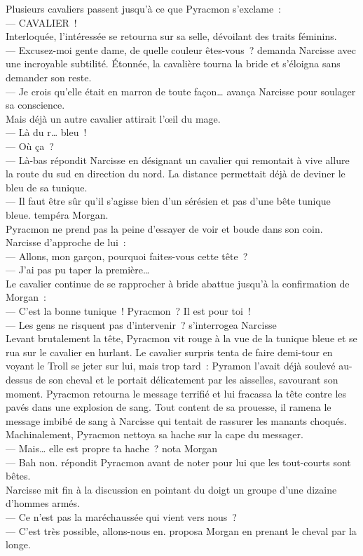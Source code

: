 \documentclass[french, a4paper, 12pt]{article}
\begin{document}
Plusieurs cavaliers passent jusqu'à ce que Pyracmon s'exclame~:\\
--- CAVALIER~!\\
Interloquée, l'intéressée se retourna sur sa selle, dévoilant des traits féminins.\\
--- Excusez-moi gente dame, de quelle couleur êtes-vous~? demanda Narcisse avec une incroyable subtilité.
Étonnée, la cavalière tourna la bride et s'éloigna sans demander son reste.\\
--- Je crois qu'elle était en marron de toute façon… avança Narcisse pour soulager sa conscience.\\
Mais déjà un autre cavalier attirait l'œil du mage.\\
--- Là du r… bleu~!\\
--- Où ça~?\\
--- Là-bas répondit Narcisse en désignant un cavalier qui remontait à vive allure la route du sud en direction du nord. La distance permettait déjà de deviner le bleu de sa tunique.\\
--- Il faut être sûr qu'il s'agisse bien d'un sérésien et pas d'une bête tunique bleue. tempéra Morgan.\\
Pyracmon ne prend pas la peine d'essayer de voir et boude dans son coin. Narcisse d'approche de lui~:\\
--- Allons, mon garçon, pourquoi faites-vous cette tête~?\\
--- J'ai pas pu taper la première…\\
Le cavalier continue de se rapprocher à bride abattue jusqu'à la confirmation de Morgan~:\\
--- C'est la bonne tunique~! Pyracmon~? Il est pour toi~!\\
--- Les gens ne risquent pas d'intervenir~? s'interrogea Narcisse\\
Levant brutalement la tête, Pyracmon vit rouge à la vue de la tunique bleue et se rua sur le cavalier en hurlant. Le cavalier surpris tenta de faire demi-tour en voyant le Troll se jeter sur lui, mais trop tard~: Pyramon l'avait déjà soulevé au-dessus de son cheval et le portait délicatement par les aisselles, savourant son moment. Pyracmon retourna le message terrifié et lui fracassa la tête contre les pavés dans une explosion de sang. Tout content de sa prouesse, il ramena le message imbibé de sang à Narcisse qui tentait de rassurer les manants choqués. Machinalement, Pyracmon nettoya sa hache sur la cape du messager.\\
--- Mais… elle est propre ta hache~? nota Morgan\\
--- Bah non. répondit Pyracmon avant de noter pour lui que les tout-courts sont bêtes.\\
Narcisse mit fin à la discussion en pointant du doigt un groupe d'une dizaine d'hommes armés.\\
--- Ce n'est pas la maréchaussée qui vient vers nous~?\\
--- C'est très possible, allons-nous en. proposa Morgan en prenant le cheval par la longe.\\
\end{document}
